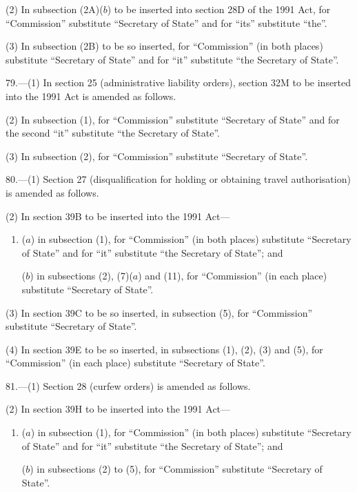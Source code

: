 \documentclass[12pt,a4paper]{article}
\begin{document}
(2) In subsection (2A)($b$)  to be inserted into section 28D of the 1991 Act, for “Commission” substitute “Secretary of State” and for “its” substitute “the”.

(3) In subsection (2B) to be so inserted, for “Commission” (in both places) substitute “Secretary of State” and for “it” substitute “the Secretary of State”.

\medskip

79.---(1)  In section 25 (administrative liability orders), section 32M to be inserted into the 1991 Act is amended as follows.

(2) In subsection (1), for “Commission” substitute “Secretary of State” and for the second “it” substitute “the Secretary of State”.

(3) In subsection (2), for “Commission” substitute “Secretary of State”.

\medskip

80.---(1)  Section 27 (disqualification for holding or obtaining travel authorisation) is amended as follows.

(2) In section 39B to be inserted into the 1991 Act—
\begin{enumerate}\item[]
($a$) in subsection (1), for “Commission” (in both places) substitute “Secretary of State” and for “it” substitute “the Secretary of State”; and

($b$) in subsections (2), (7)($a$)  and (11), for “Commission” (in each place) substitute “Secretary of State”.
\end{enumerate}

(3) In section 39C to be so inserted, in subsection (5), for “Commission” substitute “Secretary of State”.

(4) In section 39E to be so inserted, in subsections (1), (2), (3) and (5), for “Commission” (in each place) substitute “Secretary of State”.

\medskip

81.---(1)  Section 28 (curfew orders) is amended as follows.

(2) In section 39H to be inserted into the 1991 Act—
\begin{enumerate}\item[]
($a$) in subsection (1), for “Commission” (in both places) substitute “Secretary of State” and for “it” substitute “the Secretary of State”; and

($b$) in subsections (2) to (5), for “Commission” substitute “Secretary of State”.
\end{enumerate}
\end{document}
